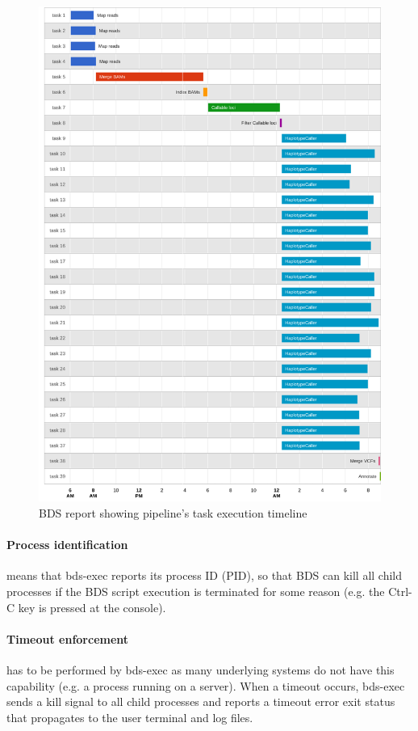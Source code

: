\begin{figure}
    \centering
    \includegraphics[width=12cm]{bds_figure_3_small.png}
    \caption{BDS report showing pipeline’s task execution timeline}
    \label{fig:bdsreport}
\end{figure}

\paragraph{Process identification} means that bds-exec reports its process ID (PID), so that BDS can kill all child processes if the BDS script execution is terminated for some reason (e.g. the Ctrl-C key is pressed at the console).

\paragraph{Timeout enforcement} has to be performed by bds-exec as many underlying systems do not have this capability (e.g. a process running on a server). When a timeout occurs, bds-exec sends a kill signal to all child processes and reports a timeout error exit status that propagates to the user terminal and log files.

